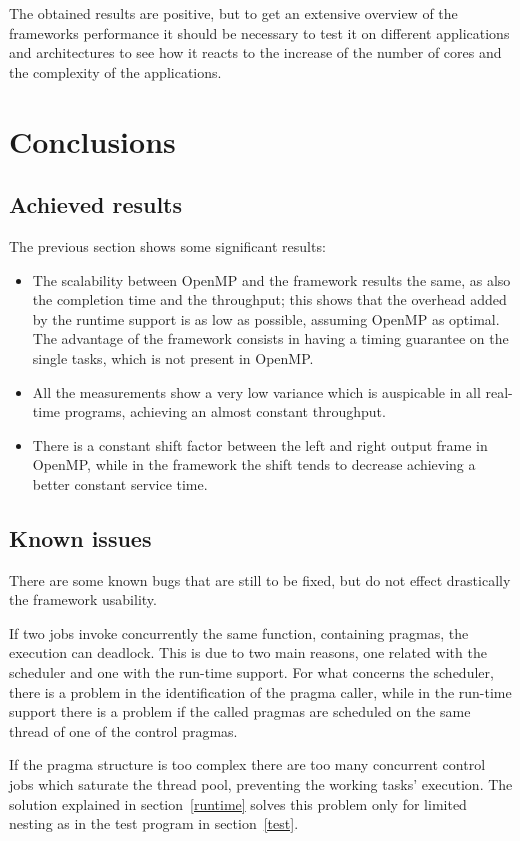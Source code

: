 \documentclass[a4paper,12pt,oneside]{book}
\begin{document}
The obtained results are positive, but to get an extensive overview of the frameworks performance it should be necessary to test it on different applications and architectures to see how it reacts to the increase of the number of cores and the complexity of the applications.


\chapter{Conclusions}
\section{Achieved results}

The previous section shows some significant results: 
\begin{itemize}
\item The scalability between OpenMP and the framework results the same, as also the completion time and the throughput; this shows that the overhead added by the runtime support is as low as possible, assuming OpenMP as optimal. The advantage of the framework consists in having a timing guarantee on the single tasks, which is not present in OpenMP. 
\item All the measurements show a very low variance which is auspicable in all real-time programs, achieving an almost constant throughput.
\item There is a constant shift factor between the left and right output frame in OpenMP, while in the framework the shift tends to decrease achieving a better constant service time.
\end{itemize}

\section{Known issues}

There are some known bugs that are still to be fixed, but do not effect drastically the framework usability. 

If two jobs invoke concurrently the same function, containing pragmas, the execution can deadlock. This is due to two main reasons, one related with the scheduler and one with the run-time support. For what concerns the scheduler, there is a problem in the identification of the pragma caller, while in the run-time support there is a problem if the called pragmas are scheduled on the same thread of one of the control pragmas. 

If the pragma structure is too complex there are too many concurrent control jobs which saturate the thread pool, preventing the working tasks' execution. The solution explained in section~\ref{runtime} solves this problem only for limited nesting as in the test program in section~\ref{test}.
\end{document}
